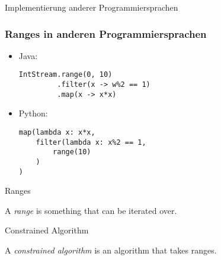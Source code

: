 \begin{frame}[fragile]{Implementierung anderer Programmiersprachen}
\frametitle{Ranges in anderen Programmiersprachen}
\begin{itemize}
\item<1->
    Java:
    \begin{verbatim}
IntStream.range(0, 10)
         .filter(x -> w%2 == 1)
         .map(x -> x*x)
    \end{verbatim}
\item<2->
    Python:
    \begin{verbatim}
map(lambda x: x*x,
    filter(lambda x: x%2 == 1,
        range(10)
    )
)
    \end{verbatim}
\end{itemize}
\end{frame}

\begin{frame}{Ranges}
    \begin{center}
        A \emph{range} is something that can be iterated over.
    \end{center}
\end{frame}

\begin{frame}{Constrained Algorithm}
    \begin{center}
        A \emph{constrained algorithm} is an algorithm that takes ranges.
    \end{center}
\end{frame}

